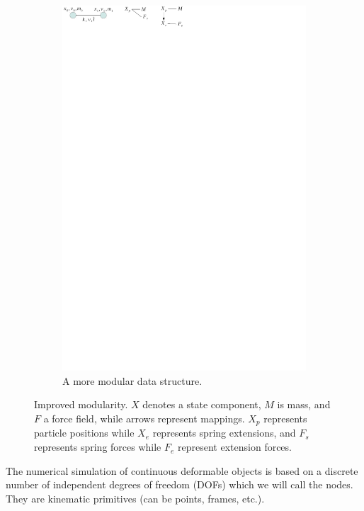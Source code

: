 \begin{figure}
\begin{subfigure}[t]{0.3\linewidth}
   \includegraphics[clip,trim=80mm 280mm 100mm 0mm]{mass-spring.pdf}
   \caption{A more modular data structure.} \label{fig mass-spring-flexible}
 \end{subfigure}
 \caption{Improved modularity. $X$ denotes a state component, $M$ is mass, and $F$ a force field, while arrows represent mappings. $X_p$ represents particle positions while $X_e$ represents spring extensions, and $F_s$ represents spring forces while $F_e$ represent extension forces.}
 \label{fig modularity mass-spring}
\end{figure}


The numerical simulation of continuous deformable objects is based on a discrete number of independent degrees of freedom (DOFs) which we will call the nodes. They are kinematic primitives (can be points, frames, etc.).


